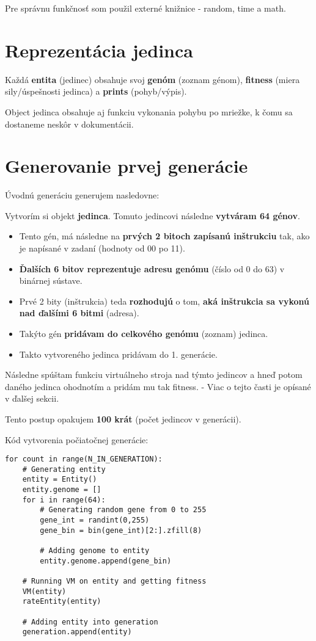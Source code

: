 \documentclass[10pt,oneside,slovak,a4paper]{article}
\begin{document}
Pre správnu funkčnosť som použil externé knižnice - random, time a math.

\section{Reprezentácia jedinca}

Každá \textbf{entita} (jedinec) obsahuje svoj \textbf{genóm} (zoznam génom), \textbf{fitness} (miera sily/úspešnosti jedinca) a \textbf{prints} (pohyb/výpis).

Object jedinca obsahuje aj funkciu vykonania pohybu po mriežke, k čomu sa dostaneme neskôr v dokumentácii.

\section{Generovanie prvej generácie}

Úvodnú generáciu generujem nasledovne:

Vytvorím si objekt \textbf{jedinca}. Tomuto jedincovi následne \textbf{vytváram 64 génov}. 

\begin{itemize}
\item{Tento gén, má následne na \textbf{prvých 2 bitoch zapísanú inštrukciu} tak, ako je napísané v zadaní (hodnoty od 00 po 11).}

\item{\textbf{Ďalších 6 bitov reprezentuje adresu genómu} (číslo od 0 do 63) v binárnej sústave.}

\item{Prvé 2 bity (inštrukcia) teda \textbf{rozhodujú} o tom, \textbf{aká inštrukcia sa vykonú nad ďalšími 6 bitmi} (adresa).}

\item{Takýto gén \textbf{pridávam do celkového genómu} (zoznam) jedinca.}

\item{Takto vytvoreného jedinca pridávam do 1. generácie.}
\end{itemize}

Následne spúštam funkciu virtuálneho stroja nad týmto jedincov a hneď potom daného jedinca ohodnotím a pridám mu tak fitness. - Viac o tejto časti je opísané v ďalšej sekcii.

Tento postup opakujem \textbf{100 krát} (počet jedincov v generácii).

Kód vytvorenia počiatočnej generácie:
\begin{lstlisting}
for count in range(N_IN_GENERATION):
    # Generating entity
    entity = Entity()
    entity.genome = []
    for i in range(64):
        # Generating random gene from 0 to 255
        gene_int = randint(0,255)
        gene_bin = bin(gene_int)[2:].zfill(8)

        # Adding genome to entity
        entity.genome.append(gene_bin)

    # Running VM on entity and getting fitness
    VM(entity)
    rateEntity(entity)
    
    # Adding entity into generation
    generation.append(entity)
\end{lstlisting}
\end{document}
